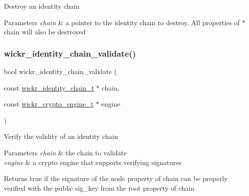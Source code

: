 Destroy an identity chain


\begin{DoxyParams}{Parameters}
{\em chain} & a pointer to the identity chain to destroy. All properties of \textquotesingle{}$\ast$chain\textquotesingle{} will also be destroyed \\
\hline
\end{DoxyParams}
\mbox{\label{group__wickr__identity_ga12f5b33c4947b6a2ca3df3bdaacafa10}} 
\subsubsection{\texorpdfstring{wickr\+\_\+identity\+\_\+chain\+\_\+validate()}{wickr\_identity\_chain\_validate()}}
{\footnotesize\ttfamily bool wickr\+\_\+identity\+\_\+chain\+\_\+validate (\begin{DoxyParamCaption}\item[{const \hyperlink{structwickr__identity__chain}{wickr\+\_\+identity\+\_\+chain\+\_\+t} $\ast$}]{chain,  }\item[{const \hyperlink{structwickr__crypto__engine}{wickr\+\_\+crypto\+\_\+engine\+\_\+t} $\ast$}]{engine }\end{DoxyParamCaption})}

Verify the validity of an identity chain


\begin{DoxyParams}{Parameters}
{\em chain} & the chain to validate \\
\hline
{\em engine} & a crypto engine that supports verifying signatures \\
\hline
\end{DoxyParams}
\begin{DoxyReturn}{Returns}
true if the \textquotesingle{}signature\textquotesingle{} of the \textquotesingle{}node\textquotesingle{} property of \textquotesingle{}chain\textquotesingle{} can be properly verified with the public \textquotesingle{}sig\+\_\+key\textquotesingle{} from the \textquotesingle{}root\textquotesingle{} property of \textquotesingle{}chain\textquotesingle{} 
\end{DoxyReturn}
\mbox{\label{group__wickr__identity_ga14d1fb3ddd1dbd7797eb9b628eef99fe}} 
